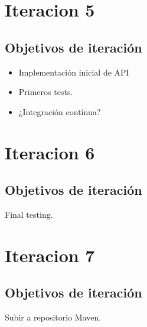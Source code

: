 \documentclass[12pt,a4paper]{report}
\begin{document}
\chapter{Iteracion 5}
\section{Objetivos de iteración}
\begin{itemize}
  \item Implementación inicial de API
  \item Primeros tests. 
  \item ¿Integración contínua?
\end{itemize}

\chapter{Iteracion 6}
\section{Objetivos de iteración}
Final testing.

\chapter{Iteracion 7}
\section{Objetivos de iteración}
Subir a repositorio Maven.
\end{document}
